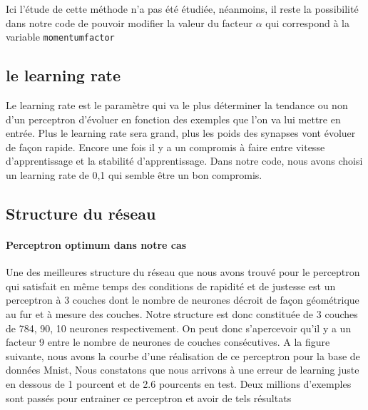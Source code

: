 \documentclass[a4paper,twoside]{report}
\begin{document}
 Ici l'étude de cette méthode n'a pas été étudiée, néanmoins, il reste la possibilité dans notre code de pouvoir modifier la valeur du facteur $\alpha$ qui correspond à la variable \texttt{momentumfactor} 
 
 
 \subsection{le learning rate}
 Le learning rate est le paramètre qui va le plus déterminer la tendance ou non d'un perceptron d'évoluer en fonction des exemples que l'on va lui mettre en entrée. Plus le learning rate sera grand, plus les poids des 
synapses vont évoluer de façon rapide. Encore une fois il y a un compromis à faire entre vitesse d'apprentissage et la stabilité d'apprentissage. Dans notre code, nous avons choisi un learning rate de 0,1 qui semble être un bon compromis.

\newpage
\subsection{Structure du réseau}

\paragraph{Perceptron optimum dans notre cas}

Une des meilleures structure du réseau que nous avons trouvé pour le perceptron qui satisfait en même temps des conditions de rapidité et de justesse est un perceptron à 3 couches dont le nombre de neurones décroit de façon géométrique au fur et à mesure des couches. Notre structure est donc constituée de 3 couches de 784, 90, 10 neurones respectivement. On peut donc s'apercevoir qu'il y a un facteur 9 entre le nombre de neurones de couches consécutives. A la figure suivante, nous avons la courbe d'une réalisation de ce perceptron pour la base de données Mnist, Nous constatons que nous arrivons à une erreur de learning juste en dessous de 1 pourcent et de 2.6 pourcents en test. Deux millions d'exemples sont passés pour entrainer ce perceptron et avoir de tels résultats
\end{document}
